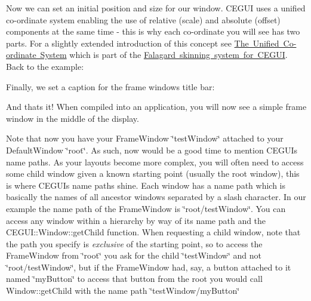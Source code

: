 Now we can set an initial position and size for our window. C\+E\+G\+UI uses a \textquotesingle{}unified\textquotesingle{} co-\/ordinate system enabling the use of relative (scale) and absolute (offset) components at the same time -\/ this is why each co-\/ordinate you will see has two parts. For a slightly extended introduction of this concept see \mbox{\hyperlink{fal_intro_fal_unifiedsystem}{The Unified Co-\/ordinate System}} which is part of the \mbox{\hyperlink{fal_man}{Falagard skinning system for C\+E\+G\+UI}}. Back to the example\+: 
\begin{DoxyCode}{0}
\DoxyCodeLine{\textcolor{comment}{// position a quarter of the way in from the top-left of parent.}}
\DoxyCodeLine{}
\DoxyCodeLine{\textcolor{comment}{// set size to be half the size of the parent}}
\end{DoxyCode}


Finally, we set a caption for the frame window\textquotesingle{}s title bar\+: 
\begin{DoxyCode}{0}
\end{DoxyCode}
 And that\textquotesingle{}s it! When compiled into an application, you will now see a simple frame window in the middle of the display.

Note that now you have your Frame\+Window \char`\"{}test\+Window\char`\"{} attached to your Default\+Window \char`\"{}root\char`\"{}. As such, now would be a good time to mention C\+E\+G\+UI\textquotesingle{}s name paths. As your layouts become more complex, you will often need to access some child window given a known starting point (usually the root window), this is where C\+E\+G\+UI\textquotesingle{}s name paths shine. Each window has a name path which is basically the names of all ancestor windows separated by a slash character. In our example the name path of the Frame\+Window is \char`\"{}root/test\+Window\char`\"{}. You can access any window within a hierarchy by way of its name path and the C\+E\+G\+U\+I\+::\+Window\+::get\+Child function. When requesting a child window, note that the path you specify is {\itshape exclusive} of the starting point, so to access the Frame\+Window from {\ttfamily \char`\"{}root\char`\"{}} you ask for the child {\ttfamily \char`\"{}test\+Window\char`\"{}} and not {\ttfamily \char`\"{}root/test\+Window\char`\"{}}, but if the Frame\+Window had, say, a button attached to it named {\ttfamily \char`\"{}my\+Button\char`\"{}} to access that button from the root you would call Window\+::get\+Child with the name path {\ttfamily \char`\"{}test\+Window/my\+Button\char`\"{}} 

